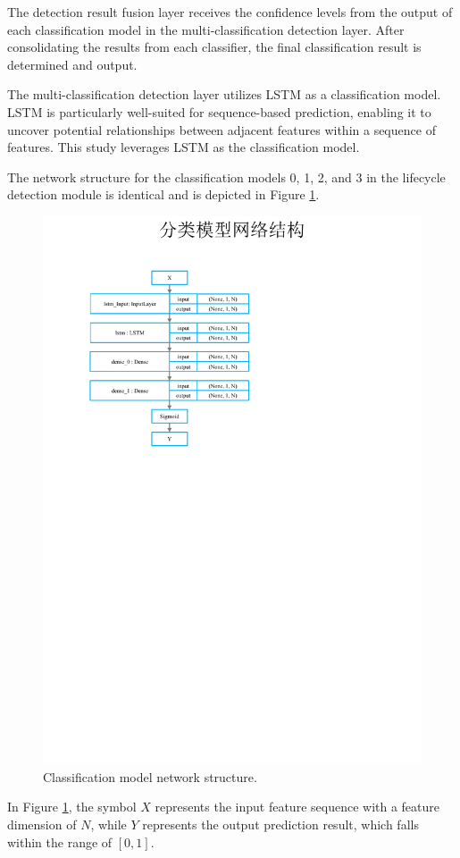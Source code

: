 \documentclass[journal]{IEEEtai}
\begin{document}
The detection result fusion layer receives the confidence levels from the output of each classification model in the multi-classification detection layer. 
After consolidating the results from each classifier, the final classification result is determined and output.

The multi-classification detection layer utilizes LSTM as a classification model. 
LSTM is particularly well-suited for sequence-based prediction, enabling it to uncover potential relationships between adjacent features within a sequence of features. This study leverages LSTM as the classification model.

The network structure for the classification models 0, 1, 2, and 3 in the lifecycle detection module is identical and is depicted in Figure \ref{classification model}.

\begin{figure}[!h]
	\centering
	\includegraphics[width = 0.7\linewidth]{Figures/classification model.pdf}
	\caption{Classification model network structure.}
	\label{classification model}
\end{figure}


In Figure \ref{classification model}, the symbol $X$ represents the input feature sequence with a feature dimension of $N$, while $Y$ represents the output prediction result, which falls within the range of $[0, 1]$.
\end{document}
